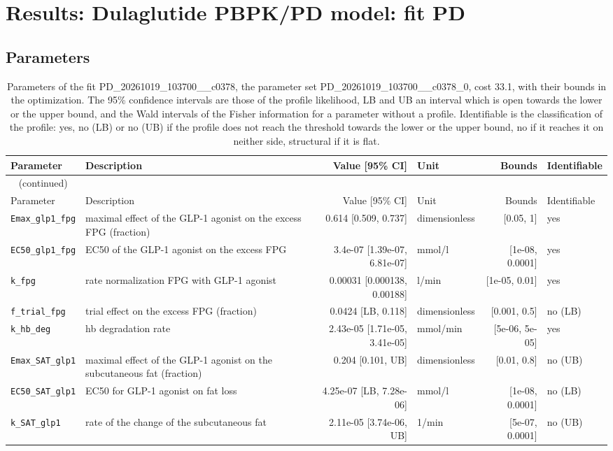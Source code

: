 \section{Results: Dulaglutide PBPK/PD model: fit PD}

\subsection{Parameters}

\begin{longtable}{llrlrl}
\caption{Parameters of the fit PD\_20261019\_103700\_\_c0378, the parameter set PD\_20261019\_103700\_\_c0378\_0, cost 33.1, with their bounds in the optimization. The 95\% confidence intervals are those of the profile likelihood, LB and UB an interval which is open towards the lower or the upper bound, and the Wald intervals of the Fisher information for a parameter without a profile. Identifiable is the classification of the profile: yes, no (LB) or no (UB) if the profile does not reach the threshold towards the lower or the upper bound, no if it reaches it on neither side, structural if it is flat.}\label{tab:parameters:PD_20261019_103700__c0378} \\
\toprule
Parameter & Description & Value [95\% CI] & Unit & Bounds & Identifiable \\
\midrule
\endfirsthead
\multicolumn{6}{l}{\small\tablename~\thetable{} (continued)} \\
\toprule
Parameter & Description & Value [95\% CI] & Unit & Bounds & Identifiable \\
\midrule
\endhead
\bottomrule
\endlastfoot
\texttt{Emax\_glp1\_fpg} & maximal effect of the GLP-1 agonist on the excess FPG (fraction) & 0.614 [0.509, 0.737] & dimensionless & [0.05, 1] & yes \\
\texttt{EC50\_glp1\_fpg} & EC50 of the GLP-1 agonist on the excess FPG & 3.4e-07 [1.39e-07, 6.81e-07] & mmol/l & [1e-08, 0.0001] & yes \\
\texttt{k\_fpg} & rate normalization FPG with GLP-1 agonist & 0.00031 [0.000138, 0.00188] & l/min & [1e-05, 0.01] & yes \\
\texttt{f\_trial\_fpg} & trial effect on the excess FPG (fraction) & 0.0424 [LB, 0.118] & dimensionless & [0.001, 0.5] & no (LB) \\
\texttt{k\_hb\_deg} & hb degradation rate & 2.43e-05 [1.71e-05, 3.41e-05] & mmol/min & [5e-06, 5e-05] & yes \\
\texttt{Emax\_SAT\_glp1} & maximal effect of the GLP-1 agonist on the subcutaneous fat (fraction) & 0.204 [0.101, UB] & dimensionless & [0.01, 0.8] & no (UB) \\
\texttt{EC50\_SAT\_glp1} & EC50 for GLP-1 agonist on fat loss & 4.25e-07 [LB, 7.28e-06] & mmol/l & [1e-08, 0.0001] & no (LB) \\
\texttt{k\_SAT\_glp1} & rate of the change of the subcutaneous fat & 2.11e-05 [3.74e-06, UB] & 1/min & [5e-07, 0.0001] & no (UB) \\
\end{longtable}

